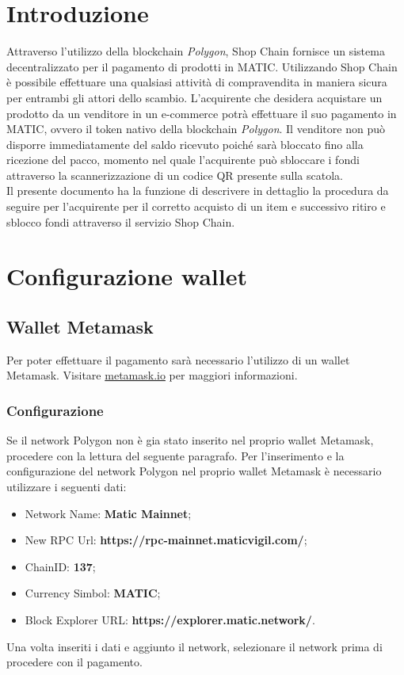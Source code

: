 \documentclass[a4paper, 12pt]{article}
\begin{document}
\makefrontpage
\makeversioni
\tableofcontents
\newpage

\section{Introduzione}
Attraverso l'utilizzo della blockchain \textit{Polygon}, Shop Chain fornisce un sistema decentralizzato per il pagamento di prodotti in MATIC. Utilizzando Shop Chain è possibile effettuare una qualsiasi attività di compravendita in maniera sicura per entrambi gli attori dello scambio. L'acquirente che desidera acquistare un prodotto da un venditore in un e-commerce potrà effettuare il suo pagamento in MATIC, ovvero il token nativo della blockchain \textit{Polygon}. Il venditore non può disporre immediatamente del saldo ricevuto poiché sarà bloccato fino alla ricezione del pacco, momento nel quale l'acquirente può sbloccare i fondi attraverso la scannerizzazione di un codice QR presente sulla scatola.\\
Il presente documento ha la funzione di descrivere in dettaglio la procedura da seguire per l'acquirente per il corretto acquisto di un item e successivo ritiro e sblocco fondi attraverso il servizio Shop Chain.

\section{Configurazione wallet}
\subsection{Wallet Metamask}
Per poter effettuare il pagamento sarà necessario l'utilizzo di un wallet Metamask. Visitare \href{https://www.metamask.io}{metamask.io} per maggiori informazioni.
\subsubsection{Configurazione}
\label{sec:network}
Se il network Polygon non è gia stato inserito nel proprio wallet Metamask, procedere con la lettura del seguente paragrafo.
Per l'inserimento e la configurazione del network Polygon nel proprio wallet Metamask è necessario utilizzare i seguenti dati:
\begin{itemize}
\item Network Name: \textbf{Matic Mainnet};
\item New RPC Url: \textbf{https://rpc-mainnet.maticvigil.com/};
\item ChainID: \textbf{137};
\item Currency Simbol: \textbf{MATIC};
\item Block Explorer URL: \textbf{https://explorer.matic.network/}.
\end{itemize}
Una volta inseriti i dati e aggiunto il network, selezionare il network prima di procedere con il pagamento.
\end{document}
